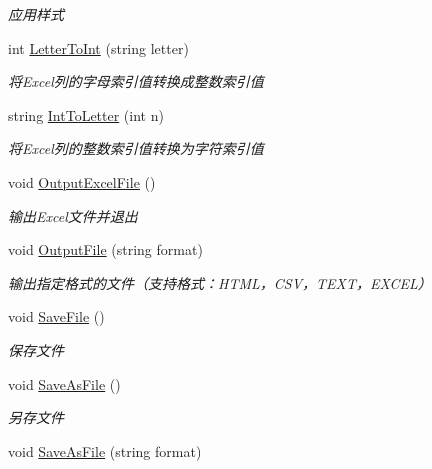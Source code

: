 \begin{DoxyCompactItemize}
\begin{DoxyCompactList}\small\item\em 应用样式 \end{DoxyCompactList}\item 
int \hyperlink{class_x_c_l_net_tools_1_1_data_handler_1_1_excel_helper_a32cace260b279a4fd6861e2925a2bbce}{Letter\-To\-Int} (string letter)
\begin{DoxyCompactList}\small\item\em 将\-Excel列的字母索引值转换成整数索引值 \end{DoxyCompactList}\item 
string \hyperlink{class_x_c_l_net_tools_1_1_data_handler_1_1_excel_helper_a69fec6dfa4e2714e3faeaa88ad92edce}{Int\-To\-Letter} (int n)
\begin{DoxyCompactList}\small\item\em 将\-Excel列的整数索引值转换为字符索引值 \end{DoxyCompactList}\item 
void \hyperlink{class_x_c_l_net_tools_1_1_data_handler_1_1_excel_helper_ad33804b2e7c24ec683fb5db86db433a3}{Output\-Excel\-File} ()
\begin{DoxyCompactList}\small\item\em 输出\-Excel文件并退出 \end{DoxyCompactList}\item 
void \hyperlink{class_x_c_l_net_tools_1_1_data_handler_1_1_excel_helper_a016cbd751ac63913cb80fe03c1870a4b}{Output\-File} (string format)
\begin{DoxyCompactList}\small\item\em 输出指定格式的文件（支持格式：\-H\-T\-M\-L，\-C\-S\-V，\-T\-E\-X\-T，\-E\-X\-C\-E\-L） \end{DoxyCompactList}\item 
void \hyperlink{class_x_c_l_net_tools_1_1_data_handler_1_1_excel_helper_aa009952e56f61cb90529bf2e68b4098b}{Save\-File} ()
\begin{DoxyCompactList}\small\item\em 保存文件 \end{DoxyCompactList}\item 
void \hyperlink{class_x_c_l_net_tools_1_1_data_handler_1_1_excel_helper_ac15d18695f8bcfb21ee446edbd173eb2}{Save\-As\-File} ()
\begin{DoxyCompactList}\small\item\em 另存文件 \end{DoxyCompactList}\item 
void \hyperlink{class_x_c_l_net_tools_1_1_data_handler_1_1_excel_helper_a70b84e514fca4175d6e78e8845b34753}{Save\-As\-File} (string format)

\end{DoxyCompactItemize}
